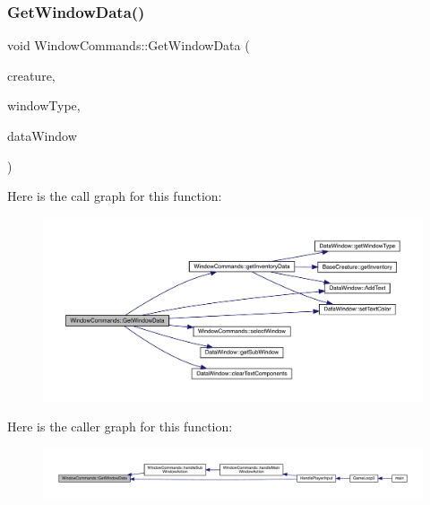 \subsubsection{\texorpdfstring{Get\+Window\+Data()}{GetWindowData()}}
{\footnotesize\ttfamily void Window\+Commands\+::\+Get\+Window\+Data (\begin{DoxyParamCaption}\item[{\mbox{\hyperlink{class_base_creature}{Base\+Creature}} \&}]{creature,  }\item[{\mbox{\hyperlink{_data_window_8hpp_a3c1e0c6fe947fdbea7502497b27cf44d}{En\+Data\+Window\+Type}}}]{window\+Type,  }\item[{\mbox{\hyperlink{class_data_window}{Data\+Window}} \&}]{data\+Window }\end{DoxyParamCaption})}

Here is the call graph for this function\+:
\nopagebreak
\begin{figure}[H]
\begin{center}
\leavevmode
\includegraphics[width=350pt]{da/d07/class_window_commands_ab301c0f80a6c632ce5a858e6307feebd_cgraph}
\end{center}
\end{figure}
Here is the caller graph for this function\+:
\nopagebreak
\begin{figure}[H]
\begin{center}
\leavevmode
\includegraphics[width=350pt]{da/d07/class_window_commands_ab301c0f80a6c632ce5a858e6307feebd_icgraph}
\end{center}
\end{figure}
\mbox{\label{class_window_commands_ac4a64479853dfa15653a7690403815b7}} 

